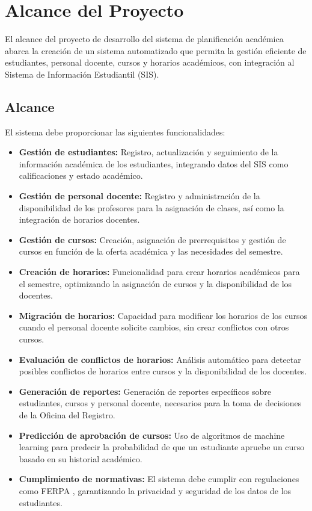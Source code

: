 \section{Alcance del Proyecto}

El alcance del proyecto de desarrollo del sistema de planificación académica abarca la creación de un sistema automatizado que permita la gestión eficiente de estudiantes, personal docente, cursos y horarios académicos, con integración al Sistema de Información Estudiantil (SIS). 

\subsection{Alcance}
El sistema debe proporcionar las siguientes funcionalidades:

\begin{itemize}
    \item \textbf{Gestión de estudiantes:} Registro, actualización y seguimiento de la información académica de los estudiantes, integrando datos del SIS como calificaciones y estado académico.
    \item \textbf{Gestión de personal docente:} Registro y administración de la disponibilidad de los profesores para la asignación de clases, así como la integración de horarios docentes.
    \item \textbf{Gestión de cursos:} Creación, asignación de prerrequisitos y gestión de cursos en función de la oferta académica y las necesidades del semestre.
    \item \textbf{Creación de horarios:} Funcionalidad para crear horarios académicos para el semestre, optimizando la asignación de cursos y la disponibilidad de los docentes.
    \item \textbf{Migración de horarios:} Capacidad para modificar los horarios de los cursos cuando el personal docente solicite cambios, sin crear conflictos con otros cursos.
    \item \textbf{Evaluación de conflictos de horarios:} Análisis automático para detectar posibles conflictos de horarios entre cursos y la disponibilidad de los docentes.
    \item \textbf{Generación de reportes:} Generación de reportes específicos sobre estudiantes, cursos y personal docente, necesarios para la toma de decisiones de la Oficina del Registro.
    \item \textbf{Predicción de aprobación de cursos:} Uso de algoritmos de machine learning para predecir la probabilidad de que un estudiante apruebe un curso basado en su historial académico.
    \item \textbf{Cumplimiento de normativas:} El sistema debe cumplir con regulaciones como FERPA , garantizando la privacidad y seguridad de los datos de los estudiantes.
\end{itemize}

